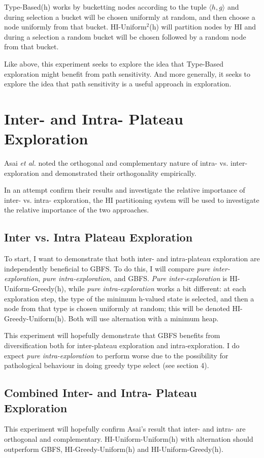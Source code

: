 \documentclass{article}
\theoremstyle{definition}
\begin{document}
Type-Based(h) works by bucketting nodes according to the tuple $\langle h, g \rangle$ and during selection a bucket will be chosen uniformly at random, and then choose a node uniformly from that bucket. HI-Uniform$^2$(h) will partition nodes by HI and during a selection a random bucket will be chosen followed by a random node from that bucket.

Like above, this experiment seeks to explore the idea that Type-Based exploration might benefit from path sensitivity. And more generally, it seeks to explore the idea that path sensitivity is a useful approach in exploration.

\section{Inter- and Intra- Plateau Exploration}
Asai \textit{et al.} noted the orthogonal and complementary nature of intra- vs. inter-exploration and demonstrated their orthogonality empirically. 

In an attempt confirm their results and investigate the relative importance of inter- vs. intra- exploration, the HI partitioning system will be used to investigate the relative importance of the two approaches. 

\subsection{Inter vs. Intra Plateau Exploration}
To start, I want to demonstrate that both inter- and intra-plateau exploration are independently beneficial to GBFS. To do this, I will compare \textit{pure inter-exploration}, \textit{pure intra-exploration}, and GBFS. \textit{Pure inter-exploration} is HI-Uniform-Greedy(h), while \textit{pure intra-exploration} works a bit different: at each exploration step, the type of the minimum h-valued state is selected, and then a node from that type is chosen uniformly at random; this will be denoted HI-Greedy-Uniform(h). Both will use alternation with a minimum heap. 

This experiment will hopefully demonstrate that GBFS benefits from diversification both for inter-plateau exploration and intra-exploration. I do expect \textit{pure intra-exploration} to perform worse due to the possibility for pathological behaviour in doing greedy type select (see section 4). 

\subsection{Combined Inter- and Intra- Plateau Exploration}
This experiment will hopefully confirm Asai's result that inter- and intra- are orthogonal and complementary. HI-Uniform-Uniform(h) with alternation should outperform GBFS, HI-Greedy-Uniform(h) and HI-Uniform-Greedy(h).
\end{document}
